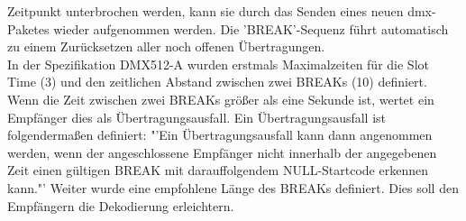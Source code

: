 \documentclass[11pt]{scrartcl}
\begin{document}
Zeitpunkt unterbrochen werden, kann sie durch das Senden eines neuen \ac{dmx}-Paketes wieder
aufgenommen werden. Die 'BREAK'-Sequenz führt automatisch zu einem Zurücksetzen aller noch
offenen Übertragungen.\\
In der Spezifikation DMX512-A wurden erstmals Maximalzeiten für die Slot Time (3) und den
zeitlichen Abstand zwischen zwei BREAKs (10) definiert. Wenn die Zeit zwischen zwei BREAKs größer
als eine Sekunde ist, wertet ein Empfänger dies als Übertragungsausfall. Ein Übertragungsausfall ist
folgendermaßen definiert: "'Ein Übertragungsausfall kann dann angenommen werden, wenn der
angeschlossene Empfänger nicht innerhalb der angegebenen Zeit einen gültigen BREAK mit
darauffolgendem NULL-Startcode erkennen kann."' \cite{dmxstandard} Weiter wurde eine empfohlene Länge
des BREAKs definiert. Dies soll den Empfängern die Dekodierung erleichtern.
\clearpage
\end{document}
